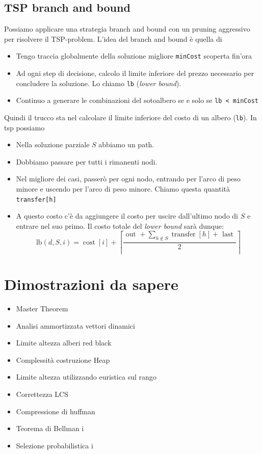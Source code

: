 \subsection{TSP branch and bound}
Possiamo applicare una strategia branch and bound con un pruning aggressivo per risolvere il TSP-problem.
L'idea del branch and bound è quella di
\begin{itemize}
	\item Tengo traccia globalmente della soluzione migliore \verb|minCost| scoperta fin'ora
	\item Ad ogni step di decisione, calcolo il limite inferiore del prezzo necessario per concludere la soluzione. Lo chiamo \verb|lb| (\textit{lower bound}).
	\item Continuo a generare le combinazioni del sotoalbero se e solo se \verb|lb < minCost|
\end{itemize}
Quindi il trucco sta nel calcolare il limite inferiore del costo di un albero (\verb|lb|). In tsp possiamo
\begin{itemize}
	\item Nella soluzione parziale $ S $ abbiamo un path.
	\item Dobbiamo passare per tutti i rimanenti nodi.
	\item Nel migliore dei casi, passerò per ogni nodo, entrando per l'arco di peso minore e uscendo per l'arco di peso minore. Chiamo questa quantità \verb|transfer[h]|
	\item A questo costo c'è da aggiungere il costo per uscire dall'ultimo nodo di $ S $ e entrare nel suo primo. Il costo totale del \textit{lower bound} sarà dunque:
	      \[
		      \mathrm{lb}(d, S, i)=\operatorname{cost}[i]+\left\lceil\frac{\text { out }+\sum_{h \notin S} \operatorname{transfer}[h]+\text { last }}{2}\right\rceil
	      \]
\end{itemize}
\section{Dimostrazioni da sapere}
\begin{itemize}
	\item Master Theorem
	\item Analisi ammortizzata vettori dinamici
	\item Limite altezza alberi red black
	\item Complessità costruzione Heap
	\item Limite altezza utilizzando euristica sul rango
	\item Correttezza LCS
	\item Compressione di huffman
	\item Teorema di Bellman
	      i
	\item Selezione probabilistica
	      i
\end{itemize}








